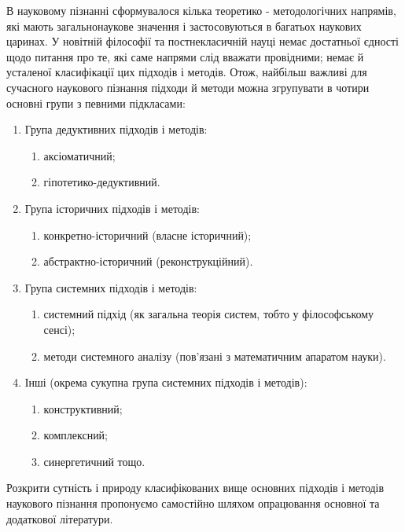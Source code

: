В науковому пізнанні сформувалося кілька теоретико - методологічних
напрямів, які мають загальнонаукове значення і застосовуються в багатьох
наукових царинах. У новітній філософії та постнекласичній науці немає
достатньої єдності щодо питання про те, які саме напрями слід вважати
провідними; немає й усталеної класифікації цих підходів і методів. Отож,
найбільш важливі для сучасного наукового пізнання підходи й методи можна
згрупувати в чотири основні групи з певними підкласами:

\begin{enumerate}
	\item Група дедуктивних підходів і методів:
	\begin{enumerate}
		\item аксіоматичний;
		\item гіпотетико-дедуктивний.
	\end{enumerate}
	\item Група історичних підходів і методів:
	\begin{enumerate}
		\item конкретно-історичний (власне історичний);
		\item абстрактно-історичний (реконструкційний).
	\end{enumerate}	
	\item Група системних підходів і методів:
	\begin{enumerate}
		\item системний підхід (як загальна теорія систем, тобто у філософському сенсі);
		\item методи системного аналізу (пов’язані з математичним апаратом науки).
	\end{enumerate}
	\item Інші (окрема сукупна група системних підходів і методів):	
	\begin{enumerate}
		\item конструктивний;
		\item комплексний;
		\item синергетичний тощо.
	\end{enumerate}
\end{enumerate}

Розкрити сутність і природу класифікованих вище основних підходів і
методів наукового пізнання пропонуємо самостійно шляхом опрацювання
основної та додаткової літератури.

